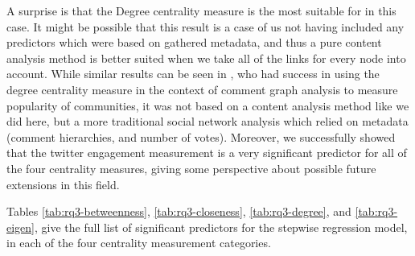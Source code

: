 \documentclass[bsc,frontabs,twoside,singlespacing,parskip,deptreport]{infthesis}
\begin{document}
\begin{table}[!h]
\centering
{}
\caption{Summary of stepwise regression results for RQ3}
\label{tab:stepwise-rq3}
\end{table}

A surprise is that the Degree centrality measure is the most suitable for in this case. It might be possible that this result is a case of us not having included any predictors which were based on gathered metadata, and thus a pure content analysis method is better suited when we take all of the links for every node into account. While similar results can be seen in \cite{steinbauer}, who had success in using the degree centrality measure in the context of comment graph analysis to measure popularity of communities, it was not based on a content analysis method like we did here, but a more traditional social network analysis which relied on metadata (comment hierarchies, and number of votes). Moreover, we successfully showed that the twitter engagement measurement is a very significant predictor for all of the four centrality measures, giving some perspective about possible future extensions in this field.

Tables \ref{tab:rq3-betweenness}, \ref{tab:rq3-closeness}, \ref{tab:rq3-degree}, and \ref{tab:rq3-eigen}, give the full list of significant predictors for the stepwise regression model, in each of the four centrality measurement categories.

\newpage
\end{document}
